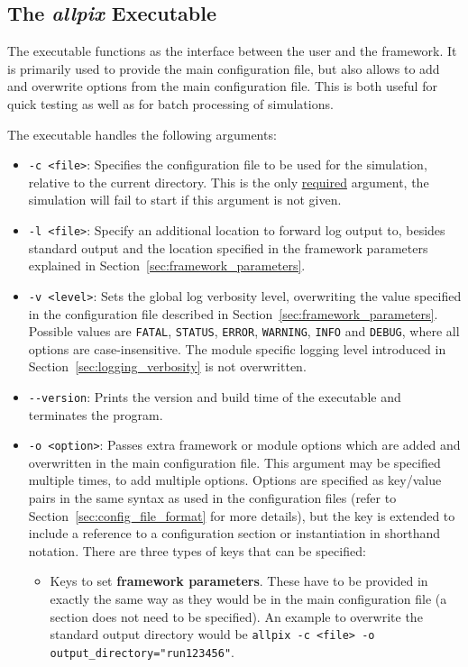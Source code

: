 \begin{itemize}
\section{The \textit{allpix} Executable}
\label{sec:allpix_executable}
The  executable functions as the interface between the user and the framework. It is primarily used to provide the main configuration file, but also allows to add and overwrite options from the main configuration file. This is both useful for quick testing as well as for batch processing of simulations.

The executable handles the following arguments:
\begin{itemize}
\item \texttt{-c <file>}: Specifies the configuration file to be used for the simulation, relative to the current directory.
This is the only \underline{required} argument, the simulation will fail to start if this argument is not given.
\item \texttt{-l <file>}: Specify an additional location to forward log output to, besides standard output and the location specified in the framework parameters explained in Section~\ref{sec:framework_parameters}.
\item \texttt{-v <level>}: Sets the global log verbosity level, overwriting the value specified in the configuration file described in Section~\ref{sec:framework_parameters}.
Possible values are \texttt{FATAL}, \texttt{STATUS}, \texttt{ERROR}, \texttt{WARNING}, \texttt{INFO} and \texttt{DEBUG}, where all options are case-insensitive.
The module specific logging level introduced in Section~\ref{sec:logging_verbosity} is not overwritten.
\item \texttt{-{}-version}: Prints the version and build time of the executable and terminates the program.
\item \texttt{-o <option>}: Passes extra framework or module options which are added and overwritten in the main configuration file.
This argument may be specified multiple times, to add multiple options.
Options are specified as key/value pairs in the same syntax as used in the configuration files (refer to Section~\ref{sec:config_file_format} for more details), but the key is extended to include a reference to a configuration section or instantiation in shorthand notation.
There are three types of keys that can be specified:
\begin{itemize}
\item Keys to set \textbf{framework parameters}. These have to be provided in exactly the same way as they would be in the main configuration file (a section does not need to be specified). An example to overwrite the standard output directory would be \texttt{allpix -c <file> -o output\_directory="run123456"}.

\end{itemize}
\end{itemize}
\end{itemize}
